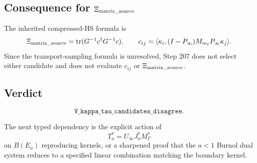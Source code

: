 \documentclass[11pt]{article}
\begin{document}
\subsection*{Consequence for \(\Xi_{\rm matrix\_source}\)}

The inherited compressed-HS formula is
\[
  \Xi_{\rm matrix\_source}=\operatorname{tr}(G^{-1}c^\dagger G^{-1}c),
  \qquad
  c_{ij}=\langle \kappa_i,(I-P_\infty)M_{m_\ell}P_\infty\kappa_j\rangle .
\]
Since the transport-sampling formula is unresolved, Step 207 does not select
either candidate and does not evaluate \(c_{ij}\) or \(\Xi_{\rm matrix\_source}\).

\subsection*{Verdict}

\[
  \boxed{\texttt{V\_kappa\_tau\_candidates\_disagree}.}
\]

The next typed dependency is the explicit action of
\[
  T_a^*=U_\infty J_a^*M_\Gamma^*
\]
on \(B(E_a)\) reproducing kernels, or a sharpened proof that the \(a<1\)
Burnol dual system reduces to a specified linear combination matching the
boundary kernel.
\end{document}
